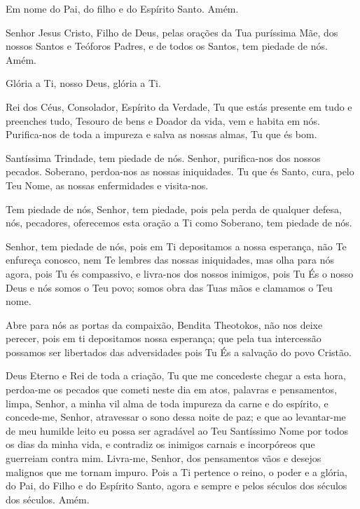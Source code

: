 \documentclass{subfiles}
\begin{document}

Em nome do Pai, do filho e do Espírito Santo. Amém. 
 
Senhor Jesus Cristo, Filho de Deus, pelas orações da Tua puríssima 
Mãe, dos nossos Santos e Teóforos Padres, e de todos os Santos, tem piedade 
de nós. Amém. 
 
Glória a Ti, nosso Deus, glória a Ti. 
 
Rei dos Céus, Consolador, Espírito da Verdade, Tu que estás presente 
em tudo e preenches tudo, Tesouro de bens e Doador da vida, vem e habita 
em nós. Purifica-nos de toda a impureza e salva as nossas almas, Tu que és 
bom. 
 
\trisagion{} \thrice{}

\Doxology{}
 
Santíssima Trindade, tem piedade de nós. Senhor, purifica-nos dos 
nossos pecados. Soberano, perdoa-nos as nossas iniquidades. Tu que és Santo, 
cura, pelo Teu Nome, as nossas enfermidades e visita-nos. 
 
\mercy{} \thrice{}
 
\Doxology{}
 
\ourFather{}


Tem piedade de nós, Senhor, tem piedade, pois pela perda de qualquer defesa,
nós, pecadores, oferecemos esta oração a Ti como Soberano, tem piedade de nós. 
 
\doxology{}

Senhor, tem piedade de nós, pois em Ti depositamos a nossa esperança, não Te
enfureça conosco, nem Te lembres das nossas iniquidades, mas olha para nós
agora, pois Tu és compassivo, e livra-nos dos nossos inimigos, pois Tu És o
nosso Deus e nós somos o Teu povo; somos obra das Tuas mãos e clamamos o Teu
nome. 
 
\nowandever{}

Abre para nós as portas da compaixão, Bendita Theotokos, não nos deixe perecer,
pois em ti depositamos nossa esperança; que pela tua intercessão possamos ser
libertados das adversidades pois Tu És a salvação do povo Cristão.

\mercy{} 

 
Deus Eterno e Rei de toda a criação, Tu que me concedeste chegar a 
esta hora, perdoa-me os pecados que cometi neste dia em atos, palavras e 
pensamentos, limpa, Senhor, a minha vil alma de toda impureza da carne e do 
espírito, e concede-me, Senhor, atravessar o sono dessa noite de paz; e que ao 
levantar-me de meu humilde leito eu possa ser agradável ao Teu Santíssimo 
Nome por todos os dias da minha vida, e contradiz os inimigos carnais e 
incorpóreos que guerreiam contra mim. Livra-me, Senhor, dos pensamentos 
vãos e desejos malignos que me tornam impuro. Pois a Ti pertence o reino, o 
poder e a glória, do Pai, do Filho e do Espírito Santo, agora e sempre e pelos 
séculos dos séculos dos séculos. Amém. 
\end{document}
